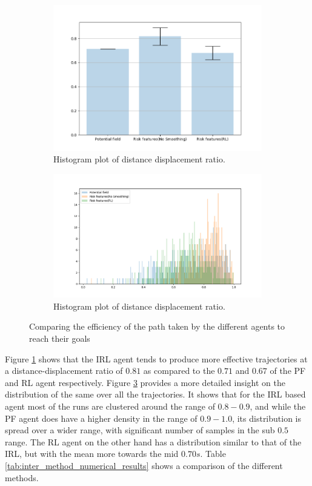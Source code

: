 \begin{figure}[!htbp]
    \begin{subfigure}{\textwidth}
        \centering
        \includegraphics[width=.7\linewidth]{plots/inter_method/distance_displacement_ratio.png}
        \caption{Histogram plot of distance displacement ratio.}
        \label{fig:inter_method-distance_disp_ratio}
    \end{subfigure}
    \begin{subfigure}{\textwidth}
        \centering
        \includegraphics[width=.95\linewidth]{plots/inter_method/histplot_displacement_ratio.png}
        \caption{Histogram plot of distance displacement ratio.}
        \label{fig:inter_method-distance_disp_ratio_histplot}
    \end{subfigure}
    \caption{Comparing the efficiency of the path taken by the different agents to reach their goals}
\end{figure}
Figure \ref{fig:inter_method-distance_disp_ratio} shows that the IRL agent tends to produce more effective trajectories at a distance-displacement ratio of $0.81$ as compared to the $0.71$ and $0.67$ of the PF and RL agent respectively. Figure \ref{fig:inter_method-distance_disp_ratio_histplot} provides a more detailed insight on the distribution of the same over all the trajectories. It shows that for the IRL based agent most of the runs are clustered around the range of $0.8 - 0.9$, and while the PF agent does have a higher density in the range of $0.9 - 1.0$, its distribution is spread over a wider range, with significant number of samples in the sub $0.5$ range. The RL agent on the other hand has a distribution similar to that of the IRL, but with the mean more towards the mid $0.70s$. Table \ref{tab:inter_method_numerical_results} shows a comparison of the different methods.
